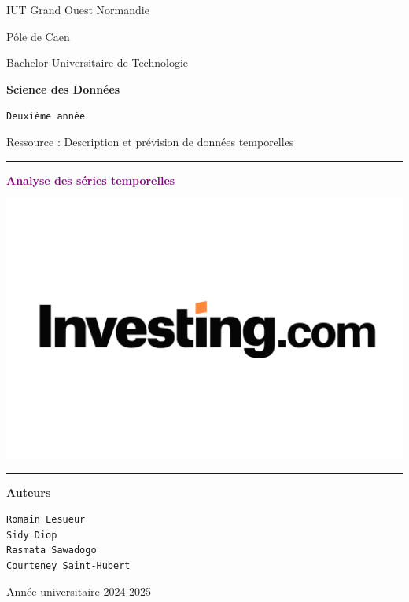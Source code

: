 \begin{center}
{\fontsize{24}{15}\selectfont IUT Grand Ouest Normandie}

\vspace{0.5cm}

{\LARGE Pôle de Caen}

\vspace{1.cm}

{\fontsize{20}{15}\selectfont Bachelor Universitaire de Technologie}

\vspace{0.4cm}

{\fontsize{20}{15}\selectfont \bf Science des Données}

\vspace{1.25cm}

{\Large \tt Deuxième année}

\vspace{0.3cm}

{\Large Ressource : Description et prévision de données temporelles}

\vspace{1cm}

\rule{0.5\textwidth}{1pt}

\vspace{0.8cm}

{\fontsize{20}{15}\selectfont \textcolor{purple}{\bf Analyse des séries temporelles}}

\vspace{1cm}

\includegraphics[scale=0.04]{Images/premier.png}

\vspace{0.3cm}

\rule{0.5\textwidth}{1pt}

\vspace{0.5cm}

{\Large \bf Auteurs}

\vspace{0.1cm}

{\tt Romain Lesueur}\\[0.2cm]
{\tt Sidy Diop}\\[0.2cm]
{\tt Rasmata Sawadogo}\\[0.2cm]
{\tt Courteney Saint-Hubert}

\vspace{1.7cm}

{\large Année universitaire 2024-2025}

\end{center}



\pagebreak
